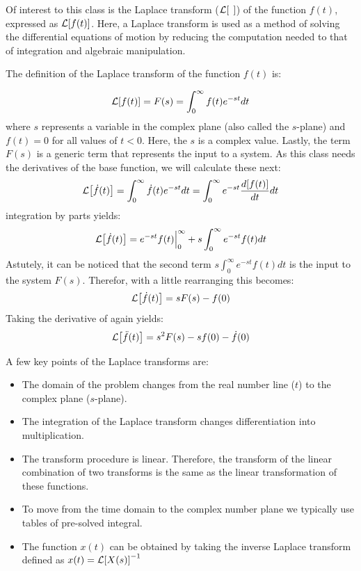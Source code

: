 \documentclass[12pt,letter]{article}
\begin{document}
\begin{review}
	
		Of interest to this class is the Laplace transform ($\mathcal{L}{\left[\hspace{1ex}\right]}$) of the function $f(t)$, expressed as $\mathcal{L}{\left[f(t)\right]}$. Here, a Laplace transform is used as a method of solving the differential equations of motion by reducing the computation needed to that of integration and algebraic manipulation. 
		
		The definition of the Laplace transform of the function $f(t)$ is:
		
		\begin{equation}
				\mathcal{L}{\left[f(t)\right]} = F(s) = \int_{0}^{\infty} f(t)e^{-st}dt
		\end{equation}
		where $s$ represents a variable in the complex plane (also called the $s$-plane) and $f(t)=0$ for all values of $t<0$. Here, the $s$ is a complex value. Lastly, the term $F(s)$ is a generic term that  represents the input to a system. As this class needs the derivatives of the base function, we will calculate these next:
		\begin{equation}
			\mathcal{L}{\left[\dot{f}(t)\right]} = \int_{0}^{\infty} \dot{f}(t)e^{-st}dt = \int_{0}^{\infty} e^{-st}\frac{d[f(t)]}{dt}dt 
		\end{equation}		
		integration by parts yields:
		\begin{equation}
			\mathcal{L}{\left[\dot{f}(t)\right]} = e^{-st}f(t)\Big|_0^\infty+s\int_{0}^{\infty}e^{-st}f(t)dt
		\end{equation}
		Astutely, it can be noticed that the second term $s\int_{0}^{\infty}e^{-st}f(t)dt$
		is the input to the system $F(s)$. Therefor, with a little rearranging this becomes:
		\begin{equation}
			\mathcal{L}{\left[\dot{f}(t)\right]} = sF(s)-f(0)
		\end{equation}
		Taking the derivative of again yields:
		\begin{equation}
			\mathcal{L}{\left[\ddot{f}(t)\right]} = s^2F(s)-sf(0)-\dot{f}(0)
		\end{equation}
		
		A few key points of the Laplace transforms are:
				
		\begin{itemize}
			\item The domain of the problem changes from the real number line ($t$) to the complex plane ($s$-plane).
			\item The integration of the Laplace transform changes differentiation into multiplication.
			\item The transform procedure is linear. Therefore, the transform of the linear combination of two transforms is the same as the linear transformation of these functions. 
			\item To move from the time domain to the complex number plane we typically use tables of pre-solved integral. 
			\item The function $x(t)$ can be obtained by taking the inverse Laplace transform defined as $x(t) = \mathcal{L}{\left[X(s)\right]}^{-1}$
		\end{itemize}


\end{review}
\end{document}
